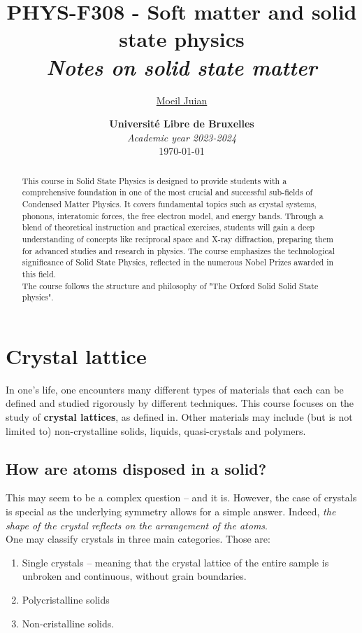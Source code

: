\documentclass[l1pt, oneside,a4paper]{article}
\title{%
  \textbf{PHYS-F308 - Soft matter and solid state physics} \\
  \textit{Notes on solid state matter}\\
}
\author{%
  \href{mailto:juian.moeil@ulb.be}{Moeil Juian}
}
\date{%
  \textbf{Université Libre de Bruxelles} \\
  \emph{Academic year 2023-2024}\\
  \today
}
\begin{document}
  \renewcommand{\partname}{Lecture}
  \maketitle
  \thispagestyle{empty}
  \tableofcontents
  \newpage

  \begin{abstract}
    This course in Solid State Physics is designed to provide students with a comprehensive foundation in one of the most crucial and successful sub-fields of Condensed Matter Physics. It covers fundamental topics such as crystal systems, phonons, interatomic forces, the free electron model, and energy bands. Through a blend of theoretical instruction and practical exercises, students will gain a deep understanding of concepts like reciprocal space and X-ray diffraction, preparing them for advanced studies and research in physics. The course emphasizes the technological significance of Solid State Physics, reflected in the numerous Nobel Prizes awarded in this field.\\

    The course follows the structure and philosophy of "The Oxford Solid Solid State physics".
  \end{abstract}

  \section{Crystal lattice}

  In one's life, one encounters many different types of materials that each can be defined and studied rigorously by different techniques. This course focuses on the study of \textbf{crystal lattices}, as defined in. Other materials may include (but is not limited to) non-crystalline solids, liquids, quasi-crystals and polymers.\\

  \subsection{How are atoms disposed in a solid?}

  This may seem to be a complex question -- and it is. However, the case of crystals is special as the underlying symmetry allows for a simple answer. Indeed, \textit{the shape of the crystal reflects on the arrangement of the atoms}.\\

  One may classify crystals in three main categories. Those are:
  \begin{enumerate}
    \item Single crystals -- meaning that the crystal lattice of the entire sample is unbroken and continuous, without grain boundaries.
    \item Polycristalline solids
    \item Non-cristalline solids.
  \end{enumerate}
\end{document}
